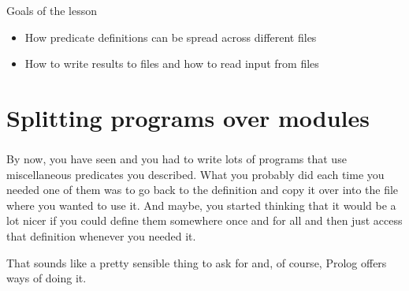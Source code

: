 \begin{frame}
	\frametitle{\insertsection}
	Goals of the lesson
	\begin{itemize}
		\item How predicate definitions can be spread across different files
		\item How to write results to files and how to read input from files
	\end{itemize}
\end{frame}


\section{Splitting programs over modules}

\begin{frame}
	\frametitle{\insertsection}
	
	
	By now, you have seen and you had to write lots of programs that use miscellaneous predicates you described. What you probably did each time you needed one of them was
	to go back to the definition and copy it over into the file where you wanted to use it. And maybe, you started thinking that it would be a lot nicer if you could define them somewhere once and for all and then just access that definition whenever you needed it.
	
	That sounds like a pretty sensible thing to ask for and, of course, Prolog offers ways of doing it.
		
\end{frame}


